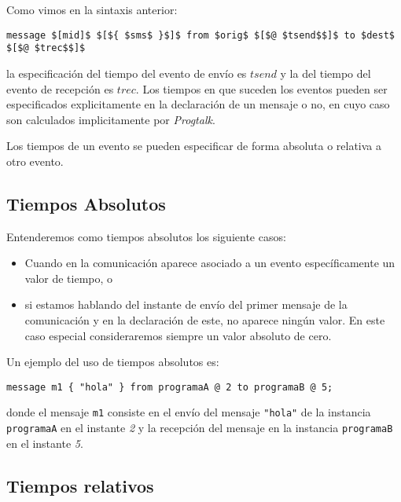 Como vimos en la sintaxis anterior:
\begin{center}
  \begin{minipage}{0.75\linewidth}
\begin{lstlisting}[mathescape]
message $[mid]$ $[${ $sms$ }$]$ from $orig$ $[$@ $tsend$$]$ to $dest$
$[$@ $trec$$]$
\end{lstlisting}
  \end{minipage}
\end{center}
la especificación del tiempo del evento de envío es $tsend$ y la del
tiempo del evento de recepción es $trec$.
 Los tiempos en que suceden los eventos pueden ser
especificados explicitamente en la declaración de un mensaje o no, en
cuyo caso son calculados implicitamente por \textit{Progtalk}.

Los tiempos de un evento se pueden especificar de forma absoluta o
relativa a otro evento.

\subsection{Tiempos Absolutos}

Entenderemos como tiempos absolutos los siguiente casos:

\begin{itemize}
\item Cuando en la comunicación aparece asociado a un evento
  específicamente un valor de tiempo, o
\item si estamos hablando del instante de envío del primer mensaje de
  la comunicación y en la declaración de este, no aparece ningún valor. En
  este caso especial consideraremos siempre un valor absoluto de cero.
\end{itemize}

Un ejemplo del uso de tiempos absolutos es:

\begin{lstlisting}
message m1 { "hola" } from programaA @ 2 to programaB @ 5;
\end{lstlisting}

donde el mensaje \lstinline{m1} consiste en el envío del mensaje
\lstinline{"hola"} de la instancia \lstinline{programaA} en el
instante \textit{2} y la recepción del mensaje en la instancia
\lstinline{programaB} en el instante \textit{5}.

\subsection{Tiempos relativos}

